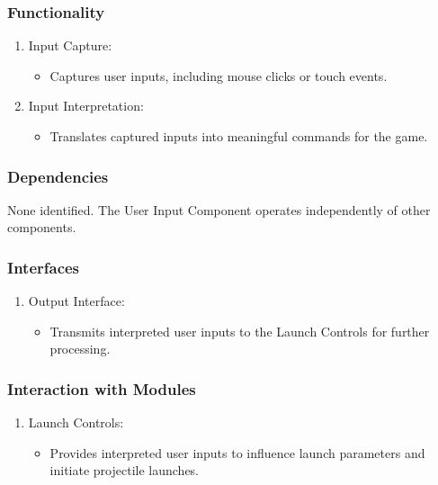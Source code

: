 \documentclass[12pt, titlepage]{article}
\begin{document}
\subsubsection{Functionality}
\begin{enumerate}
    \item Input Capture:
    \begin{itemize}
        \item Captures user inputs, including mouse clicks or touch events.
    \end{itemize}
    \item Input Interpretation:
        \begin{itemize}
            \item Translates captured inputs into meaningful commands for the game.
        \end{itemize}
\end{enumerate}

\subsubsection{Dependencies}
None identified. The User Input Component operates independently of other components.

\subsubsection{Interfaces}
\begin{enumerate}
    \item Output Interface:
        \begin{itemize}
            \item Transmits interpreted user inputs to the Launch Controls for further processing.
        \end{itemize}
\end{enumerate}

\subsubsection{Interaction with Modules}
\begin{enumerate}
    \item Launch Controls:
        \begin{itemize}
            \item Provides interpreted user inputs to influence launch parameters and initiate projectile launches.
        \end{itemize}
\end{enumerate}
\end{document}
